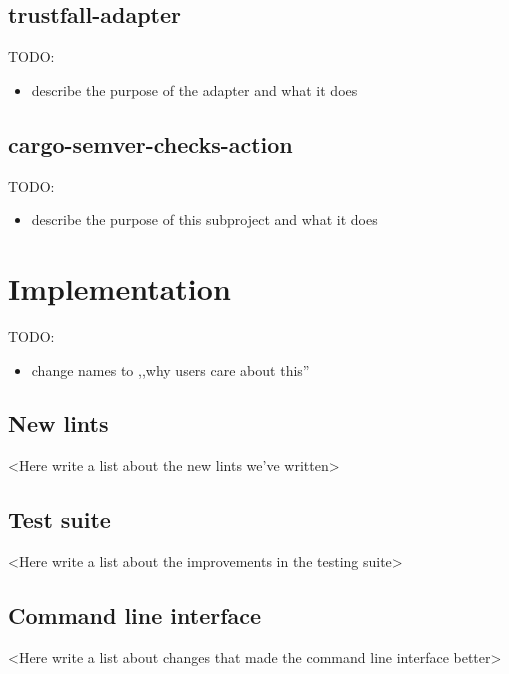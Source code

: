 \documentclass[licencjacka,en]{pracamgr}
\begin{document}
\section{trustfall-adapter}

TODO:
\begin{itemize}
	\item describe the purpose of the adapter and what it does
\end{itemize}

\section{cargo-semver-checks-action}

TODO:
\begin{itemize}
	\item describe the purpose of this subproject and what it does
\end{itemize}


\chapter{Implementation}\label{r:chapter_implementation}

TODO:
\begin{itemize}
	\item change names to ,,why users care about this''
\end{itemize}

\section{New lints}

<Here write a list about the new lints we've written>

\section{Test suite}

<Here write a list about the improvements in the testing suite>

\section{Command line interface}

<Here write a list about changes that made the command line interface better>
\end{document}

